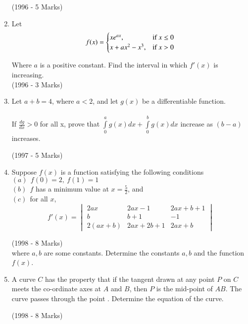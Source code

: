 \documentclass[journal,12pt,twocolumn]{IEEEtran}
\theoremstyle{remark}
\begin{document}
\begin{enumerate}
\hfill {(1996 - 5 Marks)}\\


\item Let 
\[ f(x) = \begin{cases}
xe^{ax}, & \text{if } x \leq 0\\
x+ax^2 - x^3, & \text{if } x > 0
\end{cases}\\
\]

Where $a$ is a positive constant. Find the interval in which $f'(x)$ is increasing.\\
\hfill {(1996 - 3 Marks)}\\

\item Let $a + b = 4$, where $a<2$, and let $g(x)$ be a differentiable function.\\\\
If $\frac{dg}{dx}>0$ for all x, prove that $\int\limits_0^a g(x) dx + \int\limits_0^b g(x) dx$ increase as $(b-a)$ increases.

\hfill {(1997 - 5 Marks)}\\


\item Suppose $f(x)$ is a function satisfying the following conditions\\
$(a) \ \ f(0) = 2,\ f(1) = 1$\\
$(b) \ \ f$ has a minimum value at $x = \frac{5}{2}$, and\\
$(c) \ \ $for all $x$,\\
$$f'(x)=
\begin{vmatrix}
2ax & 2ax-1 & 2ax+b+1\\
b & b+1 & -1\\
2(ax+b) & 2ax+2b+1 & 2ax+b
\end{vmatrix}$$

\hfill {(1998 - 8 Marks)}\\

where $a, b$ are some constants. Determine the constants $a, b$ and the function $f(x)$.

\item A curve $C$ has the property that if the tangent drawn at any point $P$ on $C$ meets the co-ordinate axes at $A$ and $B$, then $P$ is the mid-point of $AB$. The curve passes through the point . Determine the equation of the curve.

\hfill {(1998 - 8 Marks)}\\

 
\end{enumerate}
\end{document}
